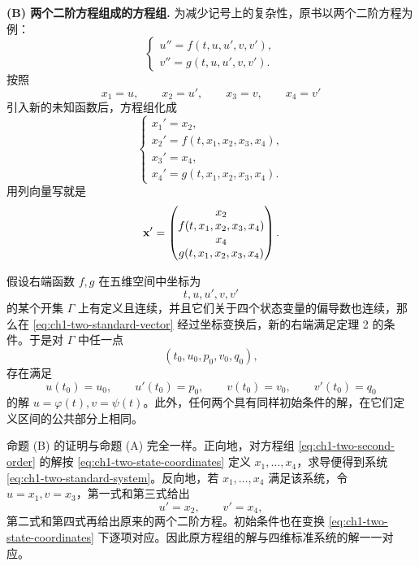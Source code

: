 \textbf{(B) 两个二阶方程组成的方程组.} 为减少记号上的复杂性，原书以两个二阶方程为例：
\begin{equation}
 \begin{cases}
  u''=f(t,u,u',v,v'),\\
  v''=g(t,u,u',v,v').
 \end{cases}
 \label{eq:ch1-two-second-order}
\end{equation}
按照
\begin{equation}
 x_1=u,\qquad x_2=u',\qquad x_3=v,\qquad x_4=v'
 \label{eq:ch1-two-state-coordinates}
\end{equation}
引入新的未知函数后，方程组化成
\begin{equation}
 \begin{cases}
  x_1'=x_2,\\
  x_2'=f(t,x_1,x_2,x_3,x_4),\\
  x_3'=x_4,\\
  x_4'=g(t,x_1,x_2,x_3,x_4).
 \end{cases}
 \label{eq:ch1-two-standard-system}
\end{equation}
用列向量写就是
\begin{equation}
 \vect{x}'=
 \begin{pmatrix}
  x_2\\
  f(t,x_1,x_2,x_3,x_4)\\
  x_4\\
  g(t,x_1,x_2,x_3,x_4)
 \end{pmatrix}.
 \label{eq:ch1-two-standard-vector}
\end{equation}

假设右端函数 \(f,g\) 在五维空间中坐标为
\[
 t,u,u',v,v'
\]
的某个开集 \(\Gamma\) 上有定义且连续，并且它们关于四个状态变量的偏导数也连续，那么在 \eqref{eq:ch1-two-standard-vector} 经过坐标变换后，新的右端满足定理 2 的条件。于是对 \(\Gamma\) 中任一点
\[
 (t_0,u_0,p_0,v_0,q_0),
\]
存在满足
\begin{equation}
 u(t_0)=u_0,\qquad u'(t_0)=p_0,
 \qquad
 v(t_0)=v_0,\qquad v'(t_0)=q_0
 \label{eq:ch1-two-initial-conditions}
\end{equation}
的解 \(u=\varphi(t),v=\psi(t)\)。此外，任何两个具有同样初始条件的解，在它们定义区间的公共部分上相同。

命题 (B) 的证明与命题 (A) 完全一样。正向地，对方程组 \eqref{eq:ch1-two-second-order} 的解按 \eqref{eq:ch1-two-state-coordinates} 定义 \(x_1,\ldots,x_4\)，求导便得到系统 \eqref{eq:ch1-two-standard-system}。反向地，若 \(x_1,\ldots,x_4\) 满足该系统，令 \(u=x_1,v=x_3\)，第一式和第三式给出
\[
 u'=x_2,
 \qquad
 v'=x_4,
\]
第二式和第四式再给出原来的两个二阶方程。初始条件也在变换 \eqref{eq:ch1-two-state-coordinates} 下逐项对应。因此原方程组的解与四维标准系统的解一一对应。

